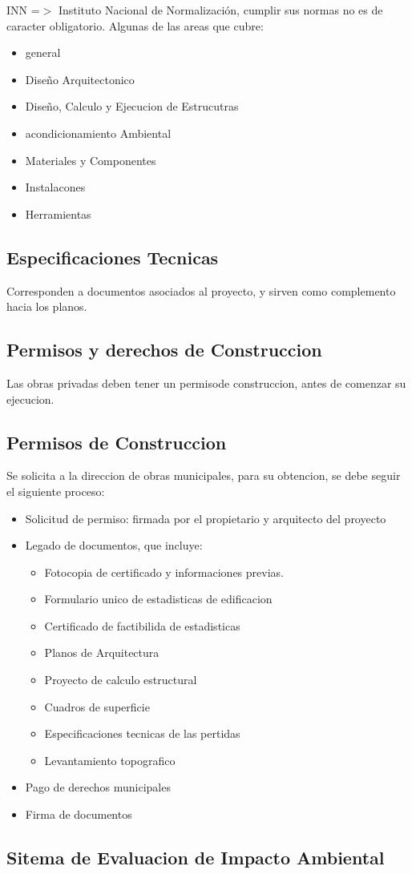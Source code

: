\documentclass{article} %
\begin{document}
INN =$>$ Instituto Nacional de Normalización, cumplir sus normas no es de caracter obligatorio. Algunas de las areas que cubre:

\begin{itemize}
    \item general
    \item Diseño Arquitectonico
    \item Diseño, Calculo y Ejecucion de Estrucutras
    \item acondicionamiento Ambiental
    \item Materiales y Componentes
    \item Instalacones
    \item Herramientas
\end{itemize}

\subsection{Especificaciones Tecnicas}

Corresponden a documentos asociados al proyecto, y sirven como complemento hacia los planos.

\subsection{Permisos y derechos de Construccion}

Las obras privadas deben tener un permisode construccion, antes de comenzar su ejecucion.

\subsection{Permisos de Construccion}

Se solicita a la direccion de obras municipales, para su obtencion, se debe seguir el siguiente proceso:

\begin{itemize}
    \item Solicitud de permiso: firmada por el propietario y arquitecto del proyecto
    \item Legado de documentos, que incluye:
    \begin{itemize}
        \item Fotocopia de certificado y informaciones previas.
        \item Formulario unico de estadisticas de edificacion
        \item Certificado de factibilida de estadisticas
        \item Planos de Arquitectura
        \item Proyecto de calculo estructural
        \item Cuadros de superficie
        \item Especificaciones tecnicas de las pertidas
        \item Levantamiento topografico
    \end{itemize}
    \item Pago de derechos municipales
    \item Firma de documentos
\end{itemize}

\subsection{Sitema de Evaluacion de Impacto Ambiental}
\end{document}
